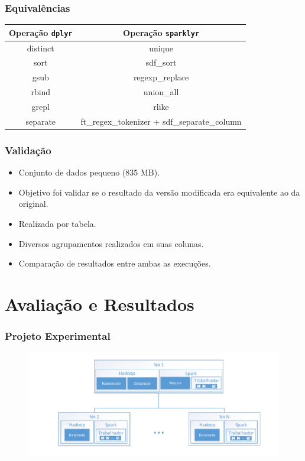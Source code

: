 \documentclass{beamer}
\begin{document}
\begin{frame}
 \frametitle{Equivalências}
 \begin{table}[H]
  \centering
  \small
  \begin{tabular}{c c} \toprule
  \textbf{Operação \texttt{dplyr}}  &  \textbf{Operação \texttt{sparklyr}}\\ 
  \midrule
  distinct	& unique  \\
  sort		& sdf\_sort \\
  gsub		& regexp\_replace\\
  rbind		& union\_all\\
  grepl		& rlike\\
  separate	& ft\_regex\_tokenizer + sdf\_separate\_column       \\
  \bottomrule
  \end{tabular}
  \label{tab:equivalence}
  \end{table}
\end{frame}

\begin{frame}
 \frametitle{Validação}
 \begin{itemize}
  \item Conjunto de dados pequeno (835 MB).
  \item Objetivo foi validar se o resultado da versão modificada era 
equivalente ao da original.
  \item Realizada por tabela.
  \item Diversos agrupamentos realizados em suas colunas.
  \item Comparação de resultados entre ambas as execuções.
 \end{itemize}
\end{frame}


\section{Avaliação e Resultados}
\begin{frame}
 \frametitle{Projeto Experimental}
  \begin{figure}[ht]
  \hspace*{-0.5cm}
  \centerline{
  \includegraphics[scale=0.65]{./img/experiments_arch.pdf}}
  \label{fig:experiment_arch}
  \end{figure}
\end{frame}
\end{document}
